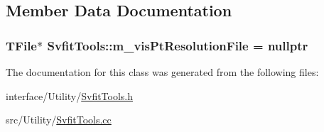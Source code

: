 \subsection{Member Data Documentation}
\hypertarget{classSvfitTools_ae505dd685534e19cf4c4fa662f0e84af}{
\subsubsection[{m\_\-visPtResolutionFile}]{\setlength{\rightskip}{0pt plus 5cm}TFile$\ast$ {\bf SvfitTools::m\_\-visPtResolutionFile} = nullptr}}
\label{classSvfitTools_ae505dd685534e19cf4c4fa662f0e84af}


The documentation for this class was generated from the following files:\begin{DoxyCompactItemize}
\item 
interface/Utility/\hyperlink{SvfitTools_8h}{SvfitTools.h}\item 
src/Utility/\hyperlink{SvfitTools_8cc}{SvfitTools.cc}\end{DoxyCompactItemize}
